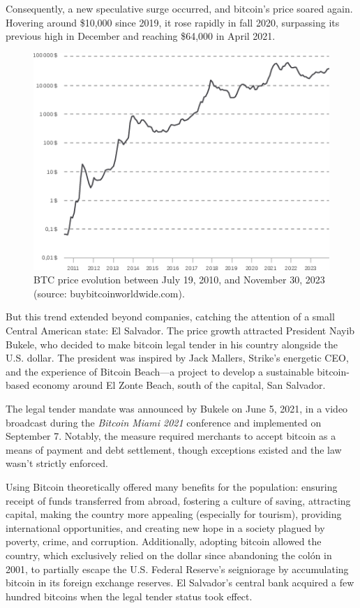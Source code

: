\documentclass[
  a5paper,
  smalldemyvopaper,10pt,twoside,onecolumn,openright,extrafontsizes,hidelinks]{memoir}
\begin{document}
Consequently, a new speculative surge occurred, and bitcoin's price
soared again. Hovering around \$10,000 since 2019, it rose rapidly in
fall 2020, surpassing its previous high in December and reaching
\$64,000 in April 2021.

\begin{figure}

{\centering \includegraphics{chapters/img/btc-historical-price-20100719-20231130.png}

}

\caption{BTC price evolution between July 19, 2010, and November 30,
2023 (source: buybitcoinworldwide.com).}

\end{figure}%

But this trend extended beyond companies, catching the attention of a
small Central American state: El Salvador. The price growth attracted
President Nayib Bukele, who decided to make bitcoin legal tender in his
country alongside the U.S. dollar. The president was inspired by Jack
Mallers, Strike's energetic CEO, and the experience of Bitcoin Beach---a
project to develop a sustainable bitcoin-based economy around El Zonte
Beach, south of the capital, San Salvador.

The legal tender mandate was announced by Bukele on June 5, 2021, in a
video broadcast during the \emph{Bitcoin Miami 2021} conference and
implemented on September 7. Notably, the measure required merchants to
accept bitcoin as a means of payment and debt settlement, though
exceptions existed and the law wasn't strictly enforced.

Using Bitcoin theoretically offered many benefits for the population:
ensuring receipt of funds transferred from abroad, fostering a culture
of saving, attracting capital, making the country more appealing
(especially for tourism), providing international opportunities, and
creating new hope in a society plagued by poverty, crime, and
corruption. Additionally, adopting bitcoin allowed the country, which
exclusively relied on the dollar since abandoning the colón in 2001, to
partially escape the U.S. Federal Reserve's seigniorage by accumulating
bitcoin in its foreign exchange reserves. El Salvador's central bank
acquired a few hundred bitcoins when the legal tender status took
effect.
\end{document}
